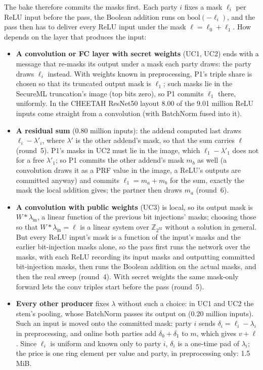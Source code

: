 The bake therefore commits the masks first. Each party $i$ fixes a mask $\ell_i$ per ReLU input before the pass, the
Boolean addition runs on $\mathrm{bool}(-\ell_i)$, and the pass then has to deliver every ReLU input under the mask
$\ell = \ell_0 + \ell_1$. How depends on the layer that produces the input:
\begin{itemize}\itemsep1pt
\item \textbf{A convolution or FC layer with secret weights} (UC1, UC2) ends with a message that re-masks its output
  under a mask each party draws: the party draws $\ell_i$ instead. With weights known in preprocessing, P1's triple
  share is chosen so that its truncated output mask is $\ell_1$; such masks lie in the SecureML truncation's image
  (top  bits zero), so P1 commits $\ell_1$ there, uniformly. In the CHEETAH ResNet50 layout 8.00 of
  the 9.01 million ReLU inputs come straight from a convolution (with BatchNorm fused into it).
\item \textbf{A residual sum} (0.80 million inputs): the addend computed last draws $\ell_i - \lambda'_i$, where
  $\lambda'$ is the other addend's mask, so that the sum carries $\ell$ (round~5). P1's masks in UC2 must lie in the
  image, which $\ell_1 - \lambda'_1$ does not for a free $\lambda'_1$; so P1 commits the other addend's mask $m_b$ as
  well (a convolution draws it as a PRF value in the image, a ReLU's outputs are committed anyway) and commits
  $\ell_1 = m_a + m_b$ for the sum, exactly the mask the local addition gives; the partner then draws $m_a$
  (round~6).
\item \textbf{A convolution with public weights} (UC3) is local, so its output mask is $W \ast \lambda_{\mathrm{in}}$, a
  linear function of the previous bit injections' masks; choosing those so that $W \ast \lambda_{\mathrm{in}} = \ell$ is
  a linear system over $\mathbb{Z}_{2^{32}}$ without a solution in general. But every ReLU input's mask is a function
  of the input's masks and the earlier bit-injection masks alone, so the pass first runs the network over the masks,
  with each ReLU recording its input masks and outputting committed bit-injection masks, then runs the Boolean addition
  on the actual masks, and then the real sweep (round~4). With secret weights the same mask-only forward lets the
  conv triples start before the pass (round~5).
\item \textbf{Every other producer} fixes $\lambda$ without such a choice: in UC1 and UC2 the stem's pooling, whose
  BatchNorm passes its output on (0.20 million inputs). Such an input is moved onto the committed mask: party $i$
  sends $\delta_i = \ell_i - \lambda_i$ in preprocessing, and online both parties add $\delta_0 + \delta_1$ to $m$,
  which gives $v + \ell$. Since $\ell_i$ is uniform and known only to party $i$, $\delta_i$ is a one-time pad of
  $\lambda_i$; the price is one ring element per value and party, in preprocessing only: 1.5\,MiB.
\end{itemize}
